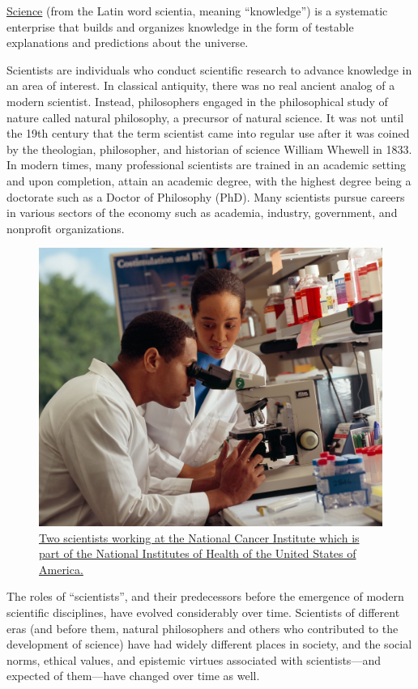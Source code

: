 \href{https://en.wikipedia.org/wiki/Science}{Science} (from the Latin word scientia, meaning ``knowledge'') is a systematic enterprise that builds and organizes knowledge in the form of testable explanations and predictions about the universe.

Scientists are individuals who conduct scientific research to advance knowledge in an area of interest. In classical antiquity, there was no real ancient analog of a modern scientist. Instead, philosophers engaged in the philosophical study of nature called natural philosophy, a precursor of natural science. It was not until the 19th century that the term scientist came into regular use after it was coined by the theologian, philosopher, and historian of science William Whewell in 1833. In modern times, many professional scientists are trained in an academic setting and upon completion, attain an academic degree, with the highest degree being a doctorate such as a Doctor of Philosophy (PhD). Many scientists pursue careers in various sectors of the economy such as academia, industry, government, and nonprofit organizations.



\begin{figure}

{\centering \includegraphics[width=0.7\linewidth]{./figures/life/Researcher_looking_through_microscope} 

}

\caption{\href{https://commons.wikimedia.org/wiki/File:Researcher_looking_through_microscope.jpg}{Two scientists working at the National Cancer Institute which is part of the National Institutes of Health of the United States of America.}}\label{fig:twoscientists}
\end{figure}

The roles of ``scientists'', and their predecessors before the emergence of modern scientific disciplines, have evolved considerably over time. Scientists of different eras (and before them, natural philosophers and others who contributed to the development of science) have had widely different places in society, and the social norms, ethical values, and epistemic virtues associated with scientists---and expected of them---have changed over time as well.

